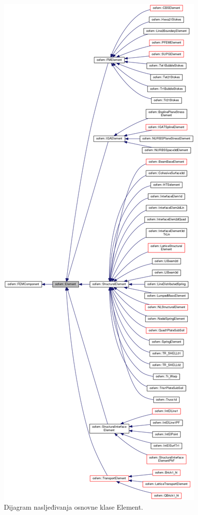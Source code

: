 \documentclass[a4paper,twoside,12pt]{memoir} %
\begin{document}
\begin{figure}[h!t]
\begin{center}
\includegraphics[scale=0.21]{pictures/chapter_oofem/Element_inhereitnace.png}
\caption{Dijagram nasljeđivanja osnovne klase Element. \cite{oofem_reference}}
\label{fig:Element_inheritance}
\end{center}
\end{figure}
\end{document}
